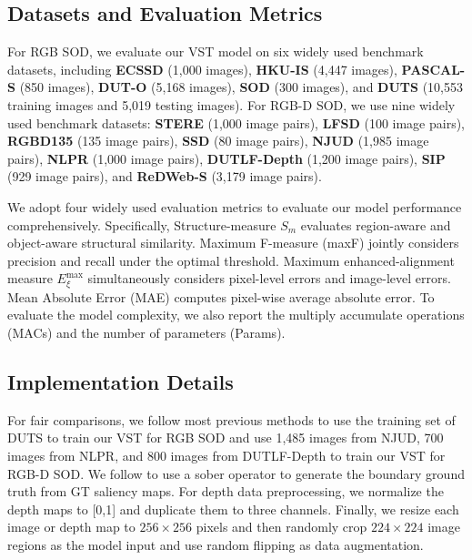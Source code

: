 \documentclass[10pt,twocolumn,letterpaper]{article}
\begin{document}
\subsection{Datasets and Evaluation Metrics}
For RGB SOD, we evaluate our VST model on six widely used benchmark datasets, including \textbf{ECSSD} \cite{yan2013ECSSD} (1,000 images), \textbf{HKU-IS} \cite{li2015HKUIS} (4,447 images), \textbf{PASCAL-S} \cite{li2014PASCALS} (850 images), \textbf{DUT-O} \cite{yang2013DUTO} (5,168 images), \textbf{SOD} \cite{movahedi2010SOD} (300 images), and \textbf{DUTS} \cite{wang2017duts} (10,553 training images and 5,019 testing images).
For RGB-D SOD, we use nine widely used benchmark datasets: \textbf{STERE} \cite{niu2012stere} (1,000 image pairs), \textbf{LFSD} \cite{li2014lfsd} (100 image pairs), \textbf{RGBD135} \cite{cheng2014rgbd135} (135 image pairs), \textbf{SSD} \cite{zhu2017ssd} (80 image pairs), \textbf{NJUD} \cite{ju2014njud} (1,985 image pairs), \textbf{NLPR} \cite{peng2014nlpr} (1,000 image pairs), \textbf{DUTLF-Depth} \cite{Piao2019dmra} (1,200 image pairs), \textbf{SIP} \cite{fan2020SIP} (929 image pairs), and \textbf{ReDWeb-S} \cite{liu2020ReDWeb-S} (3,179 image pairs).

We adopt four widely used evaluation metrics to evaluate our model performance comprehensively. Specifically, 
Structure-measure $S_m$ \cite{fan2017structure} evaluates region-aware and object-aware structural similarity. Maximum F-measure (maxF) jointly considers precision and recall under the optimal threshold. Maximum enhanced-alignment measure $E_{\xi}^{\text{max}}$ \cite{Fan2018Enhanced} simultaneously considers pixel-level errors and image-level errors. Mean Absolute Error (MAE) computes pixel-wise average absolute error. To evaluate the model complexity, we also report the multiply accumulate operations (MACs) and the number of parameters (Params).

\subsection{Implementation Details}
For fair comparisons,
we follow most previous methods to use the training set of DUTS to train our VST for RGB SOD and use 1,485 images from NJUD, 700 images from NLPR, and 800 images from DUTLF-Depth to train our VST for RGB-D SOD.
We follow \cite{zhao2019EGNet} to use a sober operator to generate the boundary ground truth from GT saliency maps.
For depth data preprocessing, we normalize the depth maps to [0,1] and duplicate them to three channels.
Finally, we resize each image or depth map to $256 \times 256$ pixels and then randomly crop $224 \times 224$ image regions as the model input and use random flipping as data augmentation.
\end{document}
